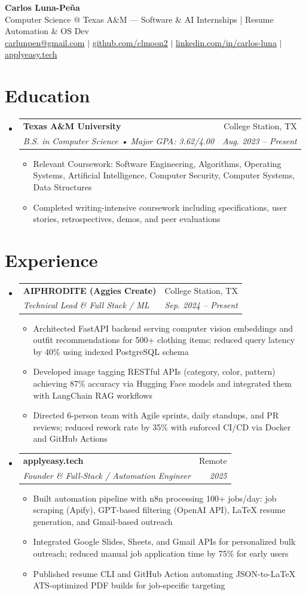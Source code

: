 \documentclass[letterpaper,11pt]{article}
\makeatletter
\newcommand{\resumeItem}[1]{
  \item\small{{#1 \vspace{-2pt}}}
}
\newcommand{\resumeSubheading}[4]{
  \vspace{-2pt}\item
    \begin{tabular*}{0.97\textwidth}[t]{l@{\extracolsep{\fill}}r}
      \textbf{#1} & #2 \\
      \textit{\small#3} & \textit{\small #4} \\
    \end{tabular*}\vspace{-7pt}
}
\newcommand{\resumeSubHeadingListStart}{\begin{itemize}[leftmargin=0.15in, label={}]}
\newcommand{\resumeSubHeadingListEnd}{\end{itemize}}
\newcommand{\resumeItemListStart}{\begin{itemize}}
\newcommand{\resumeItemListEnd}{\end{itemize}\vspace{-5pt}}
\makeatother
\begin{document}
\begin{center}
  \textbf{\Huge Carlos Luna-Pe\~na} \\
  \vspace{2pt}
  Computer Science @ Texas A\&M — Software \& AI Internships | Resume Automation \& OS Dev \\
  \vspace{2pt}
  \href{mailto:carlunpen@gmail.com}{carlunpen@gmail.com} $|$
  \href{https://github.com/clmoon2}{github.com/clmoon2} $|$
  \href{https://linkedin.com/in/carlos-luna}{linkedin.com/in/carlos-luna} $|$
  \href{https://applyeasy.tech}{applyeasy.tech}
\end{center}

\section{Education}
\resumeSubHeadingListStart
  \resumeSubheading
    {Texas A\&M University}{College Station, TX}
    {B.S. in Computer Science • Major GPA: 3.62/4.00}{Aug. 2023 -- Present}
    \resumeItemListStart
      \resumeItem{Relevant Coursework: Software Engineering, Algorithms, Operating Systems, Artificial Intelligence, Computer Security, Computer Systems, Data Structures}
      \resumeItem{Completed writing-intensive coursework including specifications, user stories, retrospectives, demos, and peer evaluations}
    \resumeItemListEnd
\resumeSubHeadingListEnd

\section{Experience}
\resumeSubHeadingListStart
  \resumeSubheading
    {AIPHRODITE (Aggies Create)}{College Station, TX}
    {Technical Lead \& Full Stack / ML}{Sep. 2024 -- Present}
    \resumeItemListStart
      \resumeItem{Architected FastAPI backend serving computer vision embeddings and outfit recommendations for 500+ clothing items; reduced query latency by 40\% using indexed PostgreSQL schema}
      \resumeItem{Developed image tagging RESTful APIs (category, color, pattern) achieving 87\% accuracy via Hugging Face models and integrated them with LangChain RAG workflows}
      \resumeItem{Directed 6-person team with Agile sprints, daily standups, and PR reviews; reduced rework rate by 35\% with enforced CI/CD via Docker and GitHub Actions}
    \resumeItemListEnd

  \resumeSubheading
    {applyeasy.tech}{Remote}
    {Founder \& Full-Stack / Automation Engineer}{2025}
    \resumeItemListStart
      \resumeItem{Built automation pipeline with n8n processing 100+ jobs/day: job scraping (Apify), GPT-based filtering (OpenAI API), LaTeX resume generation, and Gmail-based outreach}
      \resumeItem{Integrated Google Slides, Sheets, and Gmail APIs for personalized bulk outreach; reduced manual job application time by 75\% for early users}
      \resumeItem{Published resume CLI and GitHub Action automating JSON-to-LaTeX ATS-optimized PDF builds for job-specific targeting}
    \resumeItemListEnd
\resumeSubHeadingListEnd
\end{document}
